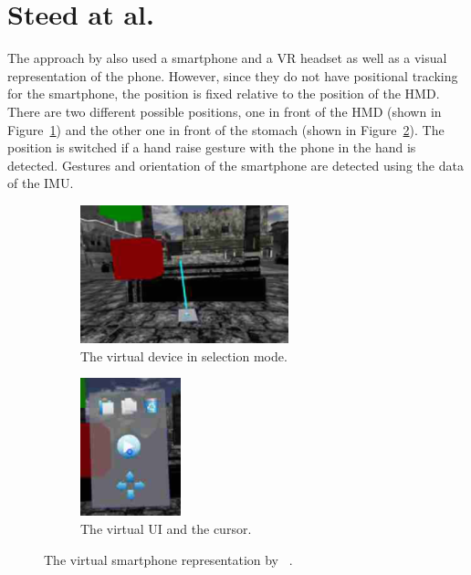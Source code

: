\section{Steed at al.}\label{section:steed-2013}
The approach by \citeauthor{Steed.2013} also used a smartphone and a \gls{VR} headset as well as a visual representation of the phone. However, since they do not have positional tracking for the smartphone, the position is fixed relative to the position of the \gls{HMD}. There are two different possible positions, one in front of the \gls{HMD} (shown in Figure~\ref{fig:steed-2013-laser-pointer}) and the other one in front of the stomach (shown in Figure~\ref{fig:steed-2013-ui}). The position is switched if a hand raise gesture with the phone in the hand is detected. Gestures and orientation of the smartphone are detected using the data of the \gls{IMU}.

\begin{figure}[H]
	\centering
	\begin{subfigure}{0.45\textwidth}%
		\centering%
		\includegraphics[height=4cm]{figures/related_work/steed_2013_laser_pointer.png}
		\caption{The virtual device in selection mode.}\label{fig:steed-2013-laser-pointer}%
	\end{subfigure}%
	\hspace{0.1\textwidth}%
	\begin{subfigure}{0.45\textwidth}%
		\centering%
		\includegraphics[height=4cm]{figures/related_work/steed_2013_ui.png}
		\caption{The virtual \gls{UI} and the cursor.}\label{fig:steed-2013-ui}
	\end{subfigure}%
	\caption[Virtual smartphone representation by Steep et al.]{The virtual smartphone representation by \citeauthor{Steed.2013}~\protect\cite[43]{Steed.2013}.}\label{fig:steed-2013}
\end{figure}

